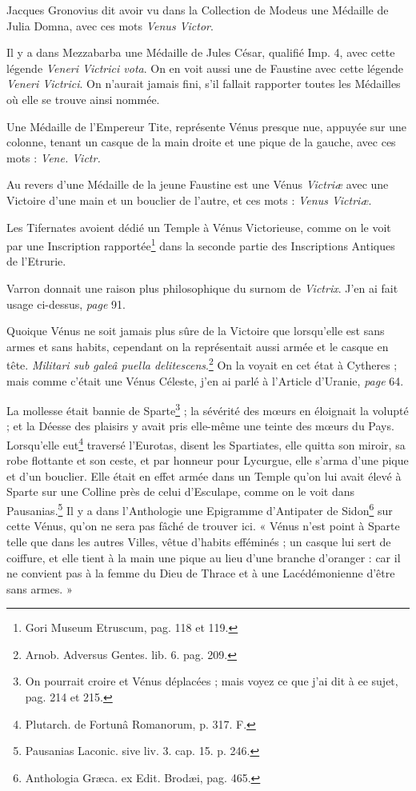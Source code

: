 \documentclass[a4paper, 11pt, oneside, polutonikogreek, french]{article}
\begin{document}
Jacques Gronovius dit avoir vu dans la Collection de Modeus une Médaille de Julia Domna, avec ces mots \emph{Venus Victor}.

Il y a dans Mezzabarba une Médaille de Jules César, qualifié Imp. 4, avec cette légende \emph{Veneri Victrici vota}. On en voit aussi une de Faustine avec cette légende \emph{Veneri Victrici}. On n'aurait jamais fini, s'il fallait rapporter toutes les Médailles où elle se trouve ainsi nommée.

Une Médaille de l'Empereur Tite, représente Vénus presque nue, appuyée sur une colonne, tenant un casque de la main droite et une pique de la gauche, avec ces mots : \emph{Vene. Victr.}

Au revers d'une Médaille de la jeune Faustine est une Vénus \emph{Victriæ} avec une Victoire d'une main et un bouclier de l'autre, et ces mots : \emph{Venus Victriæ}.

Les Tifernates avoient dédié un Temple à Vénus Victorieuse, comme on le voit par une Inscription rapportée\footnote{Gori Museum Etruscum, pag. 118 et 119.} dans la seconde partie des Inscriptions Antiques de l'Etrurie.

Varron donnait une raison plus philosophique du surnom de \emph{Victrix}. J'en ai fait usage ci-dessus, \emph{page} 91.

Quoique Vénus ne soit jamais plus sûre de la Victoire que lorsqu'elle est sans armes et sans habits, cependant on la représentait aussi armée et le casque en tête. \emph{Militari sub galeâ puella delitescens}.\footnote{Arnob. Adversus Gentes. lib. 6. pag. 209.} On la voyait en cet état à Cytheres ; mais comme c'était une Vénus Céleste, j'en ai parlé à l'Article d'Uranie, \emph{page} 64.

La mollesse était bannie de Sparte\footnote{On pourrait croire et Vénus déplacées ; mais voyez ce que j'ai dit à ee sujet, pag. 214 et 215.} ; la sévérité des mœurs en éloignait la volupté ; et la Déesse des plaisirs y avait pris elle-même une teinte des mœurs du Pays. Lorsqu'elle eut\footnote{Plutarch. de Fortunâ Romanorum, p. 317. F.} traversé l'Eurotas, disent les Spartiates, elle quitta son miroir, sa robe flottante et son ceste, et par honneur pour Lycurgue, elle s'arma d'une pique et d'un bouclier. Elle était en effet armée dans un Temple qu'on lui avait élevé à Sparte sur une Colline près de celui d'Esculape, comme on le voit dans Pausanias.\footnote{Pausanias Laconic. sive liv. 3. cap. 15. p. 246.} Il y a dans l'Anthologie une Epigramme d'Antipater de Sidon\footnote{Anthologia Græca. ex Edit. Brodæi, pag. 465.} sur cette Vénus, qu'on ne sera pas fâché de trouver ici. « Vénus n'est point à Sparte telle que dans les autres Villes, vêtue d'habits efféminés ; un casque lui sert de coiffure, et elle tient à la main une pique au lieu d'une branche d'oranger : car il ne convient pas à la femme du Dieu de Thrace et à une Lacédémonienne d'être sans armes. »
\end{document}
